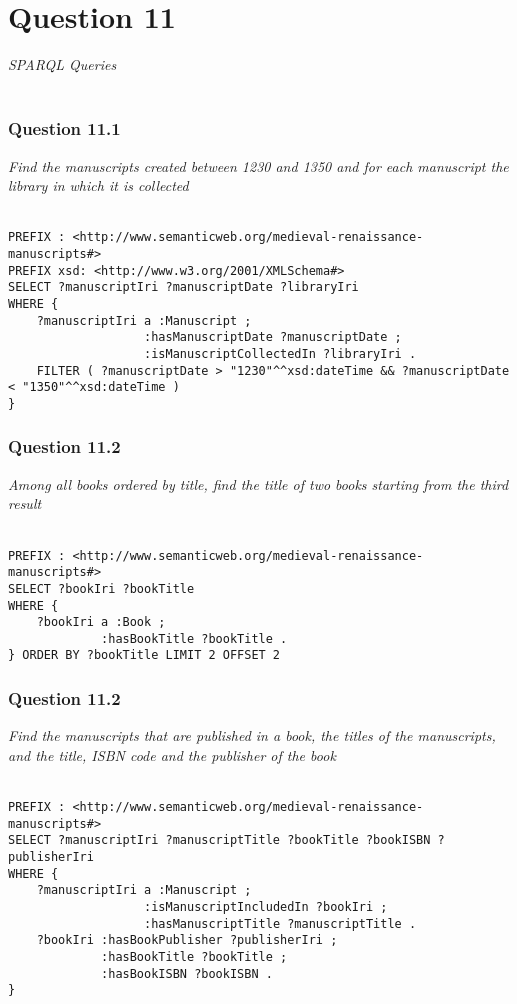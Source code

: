 \documentclass[12pt]{report}
\begin{document}
\section*{Question 11}
\textit{SPARQL Queries}\\~\\
\subsubsection*{Question 11.1}
\textit{Find the manuscripts created between 1230 and 1350 and for each manuscript the library in which it is collected}\\~\\
\begin{lstlisting}[language=SPARQL]
PREFIX : <http://www.semanticweb.org/medieval-renaissance-manuscripts#>
PREFIX xsd: <http://www.w3.org/2001/XMLSchema#>
SELECT ?manuscriptIri ?manuscriptDate ?libraryIri
WHERE {
	?manuscriptIri a :Manuscript ;
                   :hasManuscriptDate ?manuscriptDate ;
                   :isManuscriptCollectedIn ?libraryIri .
    FILTER ( ?manuscriptDate > "1230"^^xsd:dateTime && ?manuscriptDate < "1350"^^xsd:dateTime )
}
\end{lstlisting}
\subsubsection*{Question 11.2}
\textit{ Among all books ordered by title, find the title of two books starting from the third result}\\~\\
\begin{lstlisting}[language=SPARQL]
PREFIX : <http://www.semanticweb.org/medieval-renaissance-manuscripts#>
SELECT ?bookIri ?bookTitle
WHERE {
	?bookIri a :Book ;
             :hasBookTitle ?bookTitle .
} ORDER BY ?bookTitle LIMIT 2 OFFSET 2
\end{lstlisting}
\subsubsection*{Question 11.2}
\textit{Find the manuscripts that are published in a book, the titles of the manuscripts, and the title, ISBN code and the publisher of the book}\\~\\
\begin{lstlisting}[language=SPARQL]
PREFIX : <http://www.semanticweb.org/medieval-renaissance-manuscripts#>
SELECT ?manuscriptIri ?manuscriptTitle ?bookTitle ?bookISBN ?publisherIri
WHERE {
	?manuscriptIri a :Manuscript ;
                   :isManuscriptIncludedIn ?bookIri ;
                   :hasManuscriptTitle ?manuscriptTitle .
  	?bookIri :hasBookPublisher ?publisherIri ;
             :hasBookTitle ?bookTitle ;
             :hasBookISBN ?bookISBN .
}
\end{lstlisting}
\end{document}
